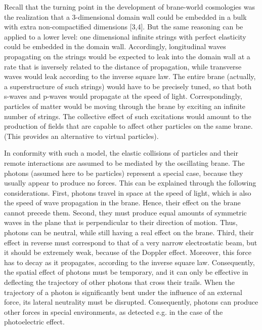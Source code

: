 \documentclass[a4paper,aps,prl,twocolumn,showpacs]{revtex4}
\begin{document}
Recall that the turning point in the development of brane-world
cosmologies was the realization that a 3-dimensional domain wall
could be embedded in a bulk with extra non-compactified dimensions
[3,4]. But the same reasoning can be applied to a lower level: one
dimensional infinite strings with perfect elasticity could be
embedded in the domain wall. Accordingly, longitudinal waves
propagating on the strings would be expected to leak into the
domain wall at a rate that is inversely related to the distance of
propagation, while transverse waves would leak according to the
inverse square law. The entire brane (actually, a superstructure
of such strings) would have to be precisely tuned, so that both
s-waves and p-waves would propagate at the speed of light.
Correspondingly, particles of matter would be moving through the
brane by exciting an infinite number of strings. The collective
effect of such excitations would amount to the production of
fields that are capable to affect other particles on the same
brane. (This provides an alternative to virtual particles).

In conformity with such a model, the elastic collisions of
particles and their remote interactions are assumed to be mediated
by the oscillating brane. The photons (assumed here to be
particles) represent a special case, because they usually appear
to produce no forces. This can be explained through the following
considerations. First, photons travel in space at the speed of
light, which is also the speed of wave propagation in the brane.
Hence, their effect on the brane cannot precede them. Second, they
must produce equal amounts of symmetric waves in the plane that is
perpendicular to their direction of motion. Thus, photons can be
neutral, while still having a real effect on the brane. Third,
their effect in reverse must correspond to that of a very narrow
electrostatic beam, but it should be extremely weak, because of
the Doppler effect. Moreover, this force has to decay as it
propagates, according to the inverse square law. Consequently, the
spatial effect of photons must be temporary, and it can only be
effective in deflecting the trajectory of other photons that cross
their trails. When the trajectory of a photon is significantly
bent under the influence of an external force, its lateral
neutrality must be disrupted. Consequently, photons can produce
other forces in special environments, as detected e.g. in the case
of the photoelectric effect.
\end{document}
